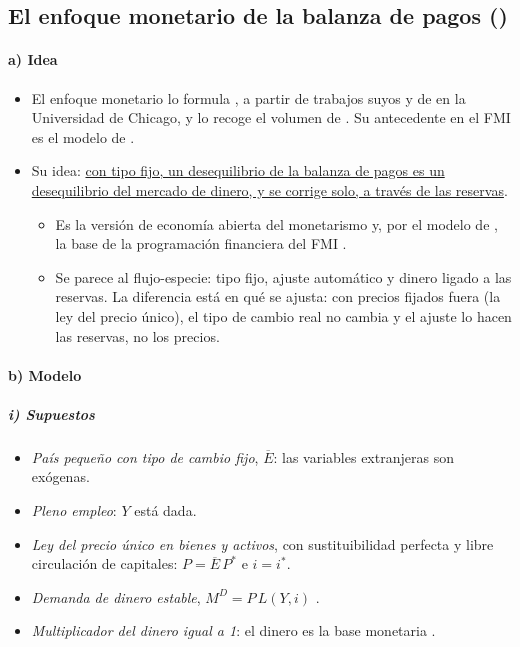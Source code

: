 \documentclass[11pt]{article}
\begin{document}
\subsection{El enfoque monetario de la balanza de pagos ()}\label{sec:enfoque-monetario}

\paragraph{a) Idea}

\begin{itemize}
\item El enfoque monetario lo formula \textcite{Johnson1972Monetary}, a partir de trabajos suyos y de  en la Universidad de Chicago, y lo recoge el volumen de \textcite{FrenkelJohnson1976Monetary}. Su antecedente en el FMI es el modelo de \textcite{Polak1957Monetary}.
\item Su idea: \uline{con tipo fijo, un desequilibrio de la balanza de pagos es un desequilibrio del mercado de dinero, y se corrige solo, a través de las reservas}.
  \begin{itemize}
  \item Es la versión de economía abierta del monetarismo  y, por el modelo de , la base de la programación financiera del FMI .
  \item Se parece al flujo-especie: tipo fijo, ajuste automático y dinero ligado a las reservas. La diferencia está en qué se ajusta: con precios fijados fuera (la ley del precio único), el tipo de cambio real no cambia y el ajuste lo hacen las reservas, no los precios\nocite{Gandolfo2016International}.
  \end{itemize}
\end{itemize}

\paragraph{b) Modelo}

\subparagraph{i) Supuestos}

\begin{itemize}
\item \emph{País pequeño con tipo de cambio fijo}, $\overline E$: las variables extranjeras son exógenas.
\item \emph{Pleno empleo}: $Y$ está dada.
\item \emph{Ley del precio único en bienes y activos}, con sustituibilidad perfecta y libre circulación de capitales: $P=\overline E\,P^*$ e $i=i^*$.
\item \emph{Demanda de dinero estable}, $M^D=P\,L(Y,i)$ .
\item \emph{Multiplicador del dinero igual a 1}: el dinero es la base monetaria .
\end{itemize}
\end{document}
